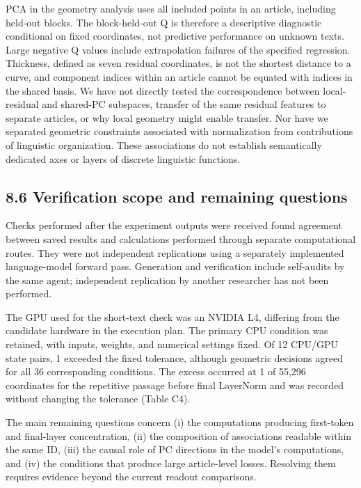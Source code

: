 PCA in the geometry analysis uses all included points in an article, including held-out blocks. The block-held-out Q is therefore a descriptive diagnostic conditional on fixed coordinates, not predictive performance on unknown texts. Large negative Q values include extrapolation failures of the specified regression. Thickness, defined as seven residual coordinates, is not the shortest distance to a curve, and component indices within an article cannot be equated with indices in the shared basis. We have not directly tested the correspondence between local-residual and shared-PC subspaces, transfer of the same residual features to separate articles, or why local geometry might enable transfer. Nor have we separated geometric constraints associated with normalization from contributions of linguistic organization. These associations do not establish semantically dedicated axes or layers of discrete linguistic functions.

\FloatBarrier

\subsection{8.6 Verification scope and remaining questions}\label{verification-scope-and-remaining-questions}

Checks performed after the experiment outputs were received found agreement between saved results and calculations performed through separate computational routes. They were not independent replications using a separately implemented language-model forward pass. Generation and verification include self-audits by the same agent; independent replication by another researcher has not been performed.

The GPU used for the short-text check was an NVIDIA L4, differing from the candidate hardware in the execution plan. The primary CPU condition was retained, with inputs, weights, and numerical settings fixed. Of 12 CPU/GPU state pairs, 1 exceeded the fixed tolerance, although geometric decisions agreed for all 36 corresponding conditions. The excess occurred at 1 of 55,296 coordinates for the repetitive passage before final LayerNorm and was recorded without changing the tolerance (Table C4).

The main remaining questions concern (i) the computations producing first-token and final-layer concentration, (ii) the composition of associations readable within the same ID, (iii) the causal role of PC directions in the model's computations, and (iv) the conditions that produce large article-level losses. Resolving them requires evidence beyond the current readout comparisons.

